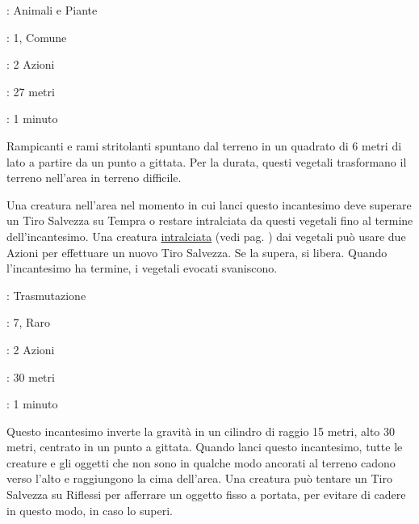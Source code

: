 \begin{multicols}{2}
\noindent\colorbox{OBSSgold!10}{
\begin{minipage}{0.95\linewidth}
\begin{description}[noitemsep, topsep=0pt, parsep=0pt, partopsep=0pt, leftmargin=0cm, labelwidth=1.3cm]
	\item[\textbf{Lista}]: Animali e Piante
	\item[\textbf{Livello}]: 1, Comune
	\item[\textbf{Lancio}]: 2 Azioni
	\item[\textbf{Gittata}]: 27 metri
	\item[\textbf{Durata}]: 1 minuto
\end{description}
\end{minipage}}\smallskip

Rampicanti e rami stritolanti spuntano dal terreno in un quadrato di 6 metri di lato a partire da un punto a gittata. Per la durata, questi vegetali trasformano il terreno nell'area in terreno difficile.

Una creatura nell'area nel momento in cui lanci questo incantesimo deve superare un Tiro Salvezza su Tempra o restare intralciata da questi vegetali fino al termine dell'incantesimo. Una creatura \hyperlink{intralciato}{intralciata} (vedi pag. \pageref{intralciato}) dai vegetali può usare due Azioni per effettuare un nuovo Tiro Salvezza. Se la supera, si libera. Quando l'incantesimo ha termine, i vegetali evocati svaniscono.

\noindent\colorbox{OBSSgold!10}{
\begin{minipage}{0.95\linewidth}
\begin{description}[noitemsep, topsep=0pt, parsep=0pt, partopsep=0pt, leftmargin=0cm, labelwidth=1.3cm]
	\item[\textbf{Lista}]: Trasmutazione
	\item[\textbf{Livello}]: 7, Raro
	\item[\textbf{Lancio}]: 2 Azioni
	\item[\textbf{Gittata}]: 30 metri
	\item[\textbf{Durata}]: 1 minuto
\end{description}
\end{minipage}}\smallskip

Questo incantesimo inverte la gravità in un cilindro di raggio 15 metri, alto 30 metri, centrato in un punto a gittata. Quando lanci questo incantesimo, tutte le creature e gli oggetti che non sono in qualche modo ancorati al terreno cadono verso l'alto e raggiungono la cima dell'area. Una creatura può tentare un Tiro Salvezza su Riflessi per afferrare un oggetto fisso a portata, per evitare di cadere in questo modo, in caso lo superi.


\end{multicols}
